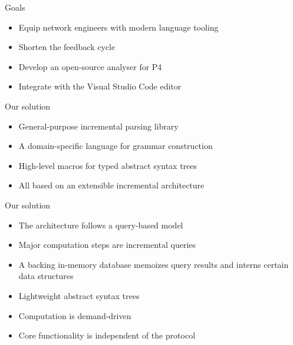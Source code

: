 \documentclass[aspectratio=169]{beamer}
\begin{document}
\begin{frame}{Goals}
	\begin{itemize}
		\item Equip network engineers with modern language tooling \pause
		\item Shorten the feedback cycle \pause
		\item Develop an open-source analyser for P4 \pause
		\item Integrate with the Visual Studio Code editor
	\end{itemize}
\end{frame}

\begin{frame}{Our solution}
	\begin{itemize}
		\item General-purpose \alert{incremental parsing} library \pause
		\item A domain-specific language for grammar construction \pause
		\item High-level macros for \alert{typed abstract syntax trees} \pause
		\item All based on an extensible incremental architecture
	\end{itemize}
\end{frame}

\begin{frame}{Our solution}
	\begin{itemize}
		\item The architecture follows a \alert{query-based model} \pause
		\item Major computation steps are \alert{incremental queries} \pause
		\item A backing in-memory database memoizes query results and interns
		certain data structures \pause
		\item Lightweight abstract syntax trees \pause
		\item Computation is \alert{demand-driven} \pause
		\item Core functionality is independent of the protocol
	\end{itemize}
\end{frame}
\end{document}
